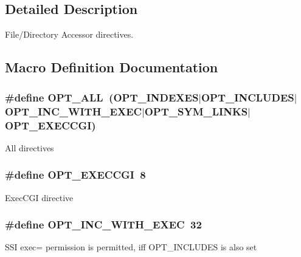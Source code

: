 \subsection{Detailed Description}
File/\+Directory Accessor directives. 



\subsection{Macro Definition Documentation}
\subsubsection[{\texorpdfstring{O\+P\+T\+\_\+\+A\+LL}{OPT_ALL}}]{\setlength{\rightskip}{0pt plus 5cm}\#define O\+P\+T\+\_\+\+A\+LL~({\bf O\+P\+T\+\_\+\+I\+N\+D\+E\+X\+ES}$\vert${\bf O\+P\+T\+\_\+\+I\+N\+C\+L\+U\+D\+ES}$\vert${\bf O\+P\+T\+\_\+\+I\+N\+C\+\_\+\+W\+I\+T\+H\+\_\+\+E\+X\+EC}$\vert${\bf O\+P\+T\+\_\+\+S\+Y\+M\+\_\+\+L\+I\+N\+KS}$\vert${\bf O\+P\+T\+\_\+\+E\+X\+E\+C\+C\+GI})}\hypertarget{group__APACHE__CORE__HTTPD__ACESSORS_ga2981c5f50d55930a31b22cc2d44a7989}{}\label{group__APACHE__CORE__HTTPD__ACESSORS_ga2981c5f50d55930a31b22cc2d44a7989}
All directives 
\subsubsection[{\texorpdfstring{O\+P\+T\+\_\+\+E\+X\+E\+C\+C\+GI}{OPT_EXECCGI}}]{\setlength{\rightskip}{0pt plus 5cm}\#define O\+P\+T\+\_\+\+E\+X\+E\+C\+C\+GI~8}\hypertarget{group__APACHE__CORE__HTTPD__ACESSORS_ga35d0bf27679f60f9045864007b03881b}{}\label{group__APACHE__CORE__HTTPD__ACESSORS_ga35d0bf27679f60f9045864007b03881b}
Exec\+C\+GI directive 
\subsubsection[{\texorpdfstring{O\+P\+T\+\_\+\+I\+N\+C\+\_\+\+W\+I\+T\+H\+\_\+\+E\+X\+EC}{OPT_INC_WITH_EXEC}}]{\setlength{\rightskip}{0pt plus 5cm}\#define O\+P\+T\+\_\+\+I\+N\+C\+\_\+\+W\+I\+T\+H\+\_\+\+E\+X\+EC~32}\hypertarget{group__APACHE__CORE__HTTPD__ACESSORS_ga3bcbdb3da98d1e1319442a3bc5a036f2}{}\label{group__APACHE__CORE__HTTPD__ACESSORS_ga3bcbdb3da98d1e1319442a3bc5a036f2}
S\+SI exec= permission is permitted, iff O\+P\+T\+\_\+\+I\+N\+C\+L\+U\+D\+ES is also set 
